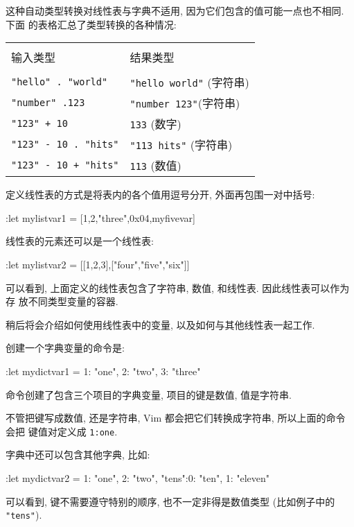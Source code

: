 这种自动类型转换对线性表与字典不适用, 因为它们包含的值可能一点也不相同. 下面
的表格汇总了类型转换的各种情况:
\begin{center}
    \begin{tabular}{ll}
        \hline \\
        输入类型 & 结果类型 \\
        \hline \\
        \texttt{"hello" . "world"}  & \texttt{"hello world"} (字符串) \\
        \texttt{"number" .123}  & \texttt{"number 123"}(字符串) \\
        \texttt{"123" + 10} & \texttt{133} (数字) \\
        \texttt{"123" - 10 . "hits"} & \texttt{"113 hits"} (字符串) \\
        \texttt{"123" - 10 + "hits"} & \texttt{113} (数值) \\
        \hline
    \end{tabular}
\end{center}

定义线性表的方式是将表内的各个值用逗号分开, 外面再包围一对中括号:
\begin{vimcode}
:let mylistvar1 = [1,2,"three",0x04,myfivevar]
\end{vimcode}
线性表的元素还可以是一个线性表:
\begin{vimcode}
    :let mylistvar2 = [[1,2,3],["four","five","six"]]
\end{vimcode}

可以看到, 上面定义的线性表包含了字符串, 数值, 和线性表. 因此线性表可以作为存
放不同类型变量的容器.

稍后将会介绍如何使用线性表中的变量, 以及如何与其他线性表一起工作.

创建一个字典变量的命令是:
\begin{vimcode}
:let mydictvar1 = {1: "one", 2: "two", 3: "three"}
\end{vimcode}
命令创建了包含三个项目的字典变量, 项目的键是数值, 值是字符串.

不管把键写成数值, 还是字符串, Vim 都会把它们转换成字符串, 所以上面的命令会把
键值对定义成 \texttt{1:one}.

字典中还可以包含其他字典, 比如:
\begin{vimcode}
:let mydictvar2 = {1: "one", 2: "two", "tens":{0: "ten", 1: "eleven"}}
\end{vimcode}
可以看到, 键不需要遵守特别的顺序, 也不一定非得是数值类型 (比如例子中的
\texttt{"tens"}).

